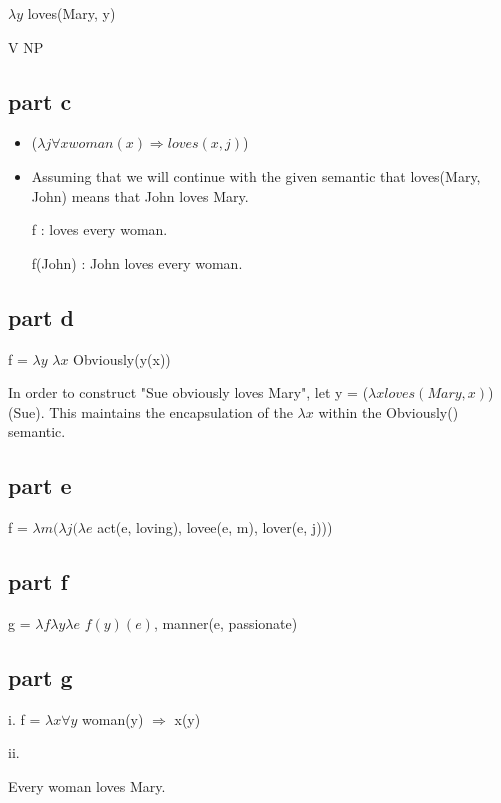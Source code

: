 \documentclass[12pt, letterpaper]{article}
\begin{document}
$\lambda y$ loves(Mary, y)

V NP

\subsection{part c}

\begin{itemize}  
\item %
($\lambda j \forall x woman(x) \Rightarrow loves(x,j)$) 
\item %
Assuming that we will continue with the given semantic that loves(Mary, John) means that John loves Mary.

f : loves every woman.

f(John) : John loves every woman.

\end{itemize}

\subsection{part d}

f = $\lambda y$ $\lambda x$ Obviously(y(x))

In order to construct "Sue obviously loves Mary", let y = ($\lambda x loves(Mary, x)$)(Sue). This maintains the encapsulation of the $\lambda x$ within the Obviously() semantic. 

\subsection{part e}
f = $\lambda m ( \lambda j ( \lambda e$ act(e, loving), lovee(e, m), lover(e, j)))

\subsection{part f}

g = $\lambda f \lambda y \lambda e$ $f(y)(e)$, manner(e, passionate)

\subsection{part g}

i. f = $\lambda x \forall y$ woman(y) $\Rightarrow$ x(y)

ii. 

Every woman loves Mary.
\end{document}
